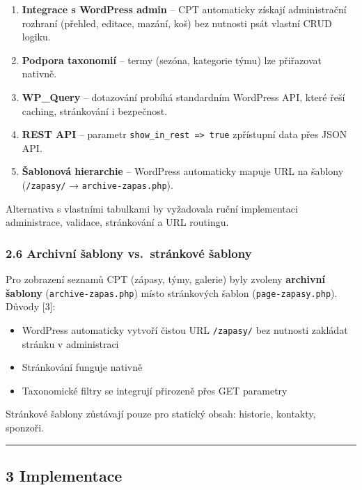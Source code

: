 \begin{enumerate}
\def\labelenumi{\arabic{enumi}.}
\tightlist
\item
  \textbf{Integrace s WordPress admin} -- CPT automaticky získají
  administrační rozhraní (přehled, editace, mazání, koš) bez nutnosti
  psát vlastní CRUD logiku.
\item
  \textbf{Podpora taxonomií} -- termy (sezóna, kategorie týmu) lze
  přiřazovat nativně.
\item
  \textbf{WP\_Query} -- dotazování probíhá standardním WordPress API,
  které řeší caching, stránkování i bezpečnost.
\item
  \textbf{REST API} -- parametr
  \texttt{show\_in\_rest\ =\textgreater{}\ true} zpřístupní data přes
  JSON API.
\item
  \textbf{Šablonová hierarchie} -- WordPress automaticky mapuje URL na
  šablony (\texttt{/zapasy/} → \texttt{archive-zapas.php}).
\end{enumerate}

Alternativa s vlastními tabulkami by vyžadovala ruční implementaci
administrace, validace, stránkování a URL routingu.

\subsubsection{2.6 Archivní šablony vs.~stránkové
šablony}\label{archivnuxed-ux161ablony-vs.-struxe1nkovuxe9-ux161ablony}

Pro zobrazení seznamů CPT (zápasy, týmy, galerie) byly zvoleny
\textbf{archivní šablony} (\texttt{archive-zapas.php}) místo stránkových
šablon (\texttt{page-zapasy.php}). Důvody {[}3{]}:

\begin{itemize}
\tightlist
\item
  WordPress automaticky vytvoří čistou URL \texttt{/zapasy/} bez
  nutnosti zakládat stránku v administraci
\item
  Stránkování funguje nativně
\item
  Taxonomické filtry se integrují přirozeně přes GET parametry
\end{itemize}

Stránkové šablony zůstávají pouze pro statický obsah: historie,
kontakty, sponzoři.

\begin{center}\rule{0.5\linewidth}{0.5pt}\end{center}

\subsection{3 Implementace}\label{implementace}

